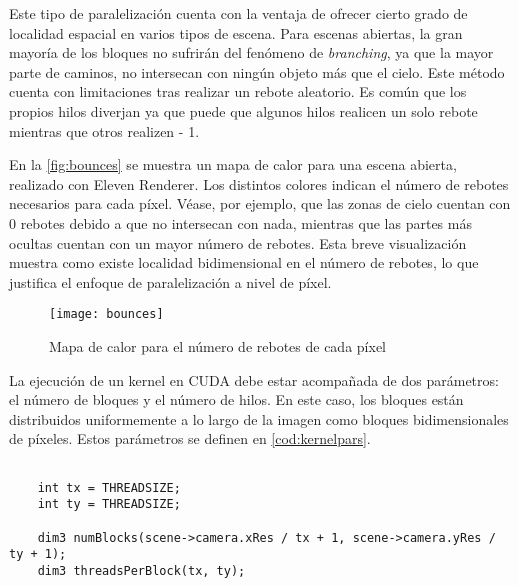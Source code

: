 Este tipo de paralelización cuenta con la ventaja de ofrecer cierto grado de localidad espacial en varios tipos de escena. Para escenas abiertas, la gran mayoría de los bloques no sufrirán del fenómeno de \emph{branching}, ya que la mayor parte de caminos, no intersecan con ningún objeto más que el cielo. Este método cuenta con limitaciones tras realizar un rebote aleatorio. Es común que los propios hilos diverjan ya que puede que algunos hilos realicen un solo rebote mientras que otros realizen  - 1.

En la \autoref{fig:bounces} se muestra un mapa de calor para una escena abierta, realizado con Eleven Renderer. Los distintos colores indican el número de rebotes necesarios para cada píxel. Véase, por ejemplo, que las zonas de cielo cuentan con 0 rebotes debido a que no intersecan con nada, mientras que las partes más ocultas cuentan con un mayor número de rebotes. Esta breve visualización muestra como existe localidad bidimensional en el número de rebotes, lo que justifica el enfoque de paralelización a nivel de píxel.

\begin{figure}[H]
\label{fig:bounces}
	\centering
	\texttt{[image: bounces]}
	
	\colorbox{red}{\strut \color{white}{0 bounces}}
	\colorbox{yellow}{\strut \color{black}{1 bounce}}
	\colorbox{green}{\strut \color{black}{2 bounces}}
	\colorbox{blue}{\strut \color{white}{3 bounces}}
	\colorbox{purple}{\strut \color{white}{4 bounces}}

	\caption{Mapa de calor para el número de rebotes de cada píxel}
\end{figure}

La ejecución de un kernel en CUDA debe estar acompañada de dos parámetros: el número de bloques y el número de hilos. En este caso, los bloques están distribuidos uniformemente a lo largo de la imagen como bloques bidimensionales de  píxeles. Estos parámetros se definen en \autoref{cod:kernelpars}.

\begin{minipage}[c]{0.95\textwidth}
\begin{lstlisting}[label={cod:kernelpars}, caption={Selección de parámetros para el kernel principal}]
	
    int tx = THREADSIZE;
    int ty = THREADSIZE;

    dim3 numBlocks(scene->camera.xRes / tx + 1, scene->camera.yRes / ty + 1);
    dim3 threadsPerBlock(tx, ty);
	
\end{lstlisting}
\end{minipage}

